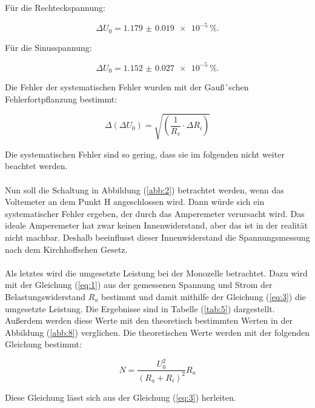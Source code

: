 Für die Rechteckspannung:

\begin{equation*}
  \Delta U_0 = \SI{1.179(19)e-5}{\percent}.
\end{equation*}

Für die Sinusspannung:

\begin{equation*}
  \Delta U_0 = \SI{1.152(27)e-5}{\percent}.
\end{equation*}

Die Fehler der systematischen Fehler wurden mit der Gauß´schen Fehlerfortpflanzung
bestimmt:

\begin{equation*}
  \Delta (\Delta U_0) = \sqrt{\left(\frac{1}{R_v} \cdot \Delta R_i\right)}
\end{equation*}

Die systematischen Fehler sind so gering, dass sie im folgenden nicht weiter beachtet werden. \\\\

Nun soll die Schaltung in Abbildung (\ref{abb:2}) betrachtet werden, wenn das Voltemeter an
dem Punkt H angeschlossen wird. Dann würde sich ein systematischer Fehler ergeben, der
durch das Amperemeter verursacht wird. Das ideale Amperemeter hat zwar keinen Innenwiderstand,
aber das ist in der realität nicht machbar. Deshalb beeinflusst dieser Innenwiderstand
die Spannungsmessung nach dem Kirchhoffschen Gesetz.\\\\

Als letztes wird die umgesetzte Leistung bei der Monozelle betrachtet. Dazu wird mit der
Gleichung (\ref{eq:1}) aus der gemessenen Spannung und Strom der Belastungswiderstand $R_a$ bestimmt
und damit mithilfe der Gleichung (\ref{eq:3}) die umgesetzte Leistung. Die Ergebnisse sind
in Tabelle (\ref{tab:5}) dargestellt. Außerdem werden diese Werte mit den theoretisch
bestimmten Werten in der Abbildung (\ref{abb:8}) verglichen. Die theoretischen Werte
werden mit der folgenden Gleichung bestimmt:

\begin{equation*}
  N = \frac{U_0^2}{(R_a + R_i)^2} R_a
\end{equation*}

Diese Gleichung lässt sich aus der Gleichung (\ref{eq:3}) herleiten.

